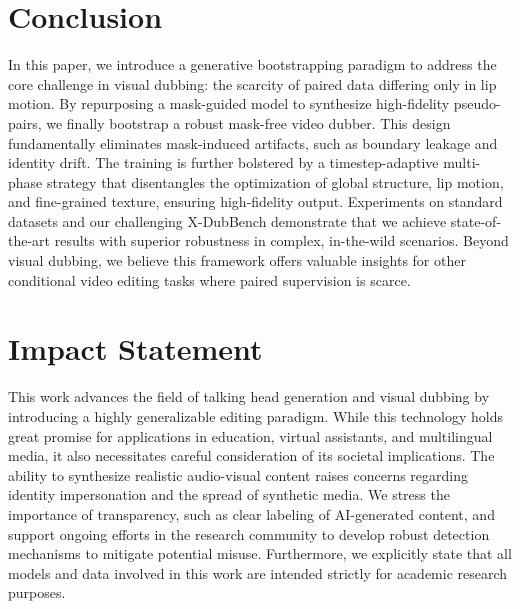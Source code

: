 \documentclass{article}
\newcommand{\benchname}{X-DubBench}
\theoremstyle{plain}
\theoremstyle{definition}
\theoremstyle{remark}
\begin{document}
\section{Conclusion}
In this paper, we introduce a generative bootstrapping paradigm to address the core challenge in visual dubbing: the scarcity of paired data differing only in lip motion. 
By repurposing a mask-guided model to synthesize high-fidelity pseudo-pairs, we finally bootstrap a robust mask-free video dubber. 
This design fundamentally eliminates mask-induced artifacts, such as boundary leakage and identity drift. 
The training is further bolstered by a timestep-adaptive multi-phase strategy that disentangles the optimization of global structure, lip motion, and fine-grained texture, ensuring high-fidelity output.
Experiments on standard datasets and our challenging \benchname{} demonstrate that we achieve state-of-the-art results with superior robustness in complex, in-the-wild scenarios. 
Beyond visual dubbing, we believe this framework offers valuable insights for other conditional video editing tasks where paired supervision is scarce.




\section*{Impact Statement}
This work advances the field of talking head generation and visual dubbing by introducing a highly generalizable editing paradigm. 
While this technology holds great promise for applications in education, virtual assistants, and multilingual media, it also necessitates careful consideration of its societal implications. 
The ability to synthesize realistic audio-visual content raises concerns regarding identity impersonation and the spread of synthetic media. 
We stress the importance of transparency, such as clear labeling of AI-generated content, and support ongoing efforts in the research community to develop robust detection mechanisms to mitigate potential misuse. 
Furthermore, we explicitly state that all models and data involved in this work are intended strictly for academic research purposes.

\nocite{langley00}




\newpage
\appendix
\onecolumn


\end{document}
